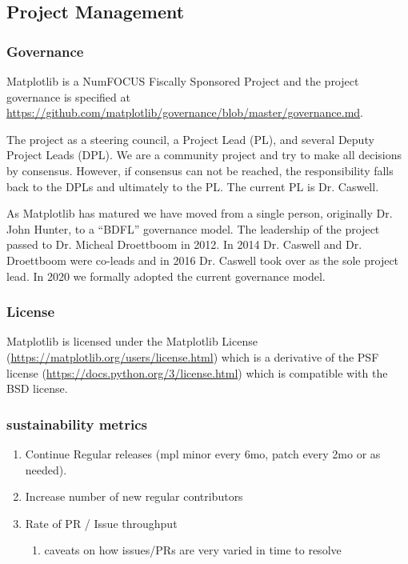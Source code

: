 \documentclass[12pt]{article}
\numberwithin{page}{section}
\begin{document}
\subsection{Project Management}
\subsubsection{Governance}

Matplotlib is a NumFOCUS Fiscally Sponsored Project and
the project governance is specified at
\url{https://github.com/matplotlib/governance/blob/master/governance.md}.

The project as a steering council, a Project Lead (PL), and several
Deputy Project Leads (DPL).  We are a community project and try to
make all decisions by consensus.  However, if consensus can not be
reached, the responsibility falls back to the DPLs and ultimately to
the PL.  The current PL is Dr. Caswell.

As Matplotlib has matured we have moved from a single person,
originally Dr. John Hunter, to a ``BDFL'' governance model.  The
leadership of the project passed to Dr. Micheal Droettboom in 2012.
In 2014 Dr. Caswell and Dr. Droettboom were co-leads and in 2016
Dr. Caswell took over as the sole project lead.  In 2020 we formally
adopted the current governance model.

\subsubsection{License}

Matplotlib is licensed under the Matplotlib License
(\url{https://matplotlib.org/users/license.html}) which is a
derivative of the PSF license
(\url{https://docs.python.org/3/license.html}) which is compatible
with the BSD license.


\subsubsection{sustainability metrics}
\begin{enumerate}
\item Continue Regular releases (mpl minor every 6mo, patch every 2mo
  or as needed).
\item Increase number of new regular contributors
\item Rate of PR / Issue throughput
  \begin{enumerate}
  \item caveats on how issues/PRs are very varied in time to resolve
  \end{enumerate}
\end{enumerate}
\end{document}
